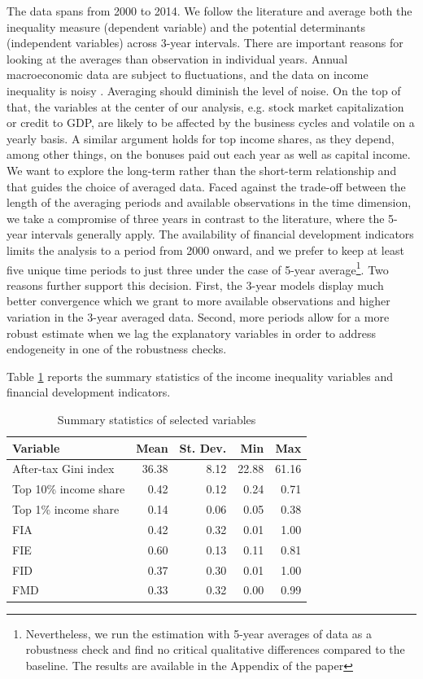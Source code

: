 \documentclass[preprint, nonatbib, 10pt]{elsarticle}
\begin{document}
The data spans from 2000 to 2014. We follow the literature \parencite{dabla2015causes,de2017finance} and average both the inequality measure (dependent variable) and the potential determinants (independent variables) across 3-year intervals. There are important reasons for looking at the averages than observation in individual years. Annual macroeconomic data are subject to fluctuations, and the data on income inequality is noisy \parencite{delis2014}. Averaging should diminish the level of noise. On the top of that, the variables at the center of our analysis, e.g. stock market capitalization or credit to \ac{GDP}, are likely to be affected by the business cycles and volatile on a yearly basis. A similar argument holds for top income shares, as they depend, among other things, on the bonuses paid out each year as well as capital income. We want to explore the long-term rather than the short-term relationship and that guides the choice of averaged data. Faced against the trade-off between the length of the averaging periods and available observations in the time dimension, we take a compromise of three years in contrast to the literature, where the 5-year intervals generally apply. The availability of financial development indicators limits the analysis to a period from 2000 onward, and we prefer to keep at least five unique time periods to just three under the case of 5-year average\footnote{Nevertheless, we run the estimation with 5-year averages of data as a robustness check and find no critical qualitative differences compared to the baseline. The results are available in the Appendix of the paper}. Two reasons further support this decision. First, the 3-year models display much better convergence which we grant to more available observations and higher variation in the 3-year averaged data. Second, more periods allow for a more robust estimate when we lag the explanatory variables in order to address endogeneity in one of the robustness checks.

Table \ref{tab:sum} reports the summary statistics of the income inequality variables and financial development indicators.

\begin{table}[ht!]
  \small
  \caption{Summary statistics of selected variables}
  \label{tab:sum}
  \centering
     \begin{tabular}{lrrrr}
      \toprule
      Variable & Mean & St. Dev. & Min & Max \\
      \midrule
      After-tax Gini index  & 36.38 & 8.12 & 22.88 & 61.16 \\
      Top 10\% income share & 0.42 & 0.12 & 0.24 & 0.71 \\
      Top 1\% income share & 0.14 & 0.06 & 0.05 & 0.38 \\
      FIA & 0.42 & 0.32 & 0.01 & 1.00 \\
      FIE & 0.60 & 0.13 & 0.11 & 0.81 \\
      FID & 0.37 & 0.30 & 0.01 & 1.00 \\      
      FMD & 0.33 & 0.32 & 0.00 & 0.99 \\
      \bottomrule
  \end{tabular}
\end{table}
%
%
%
%
%
\end{document}
